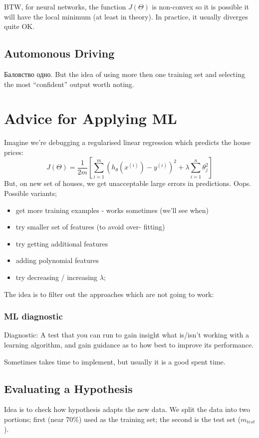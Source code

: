 \documentclass{scrartcl}
\begin{document}
BTW, for neural networks, the function $J(\Theta)$ is non-convex so it
is possible it will have the local minimum (at least in theory). In
practice, it usually diverges quite OK.

\subsection{Automonous Driving}
\label{sec:9-8}
Баловство одно. But the idea of using more then one training set and
selecting the most ``confident'' output worth noting.


\section{Advice for Applying ML}
\label{sec:10}
Imagine we're debugging a regularised linear regression which predicts
the house prices:
\[J(\Theta) = \frac{1}{2m} \left[ \sum\limits_{i=1}^{m}
  (h_\theta(x^{(i)}) - y^{(i)})^2 + \lambda \sum
  \limits_{i=1}^{n}\theta_j^2 \right] \] But, on new set of houses, we
get unacceptable large errors in predictions. Oops.
Possible variants;
\begin{itemize}
\item get more training examples - works sometimes (we'll see when)
\item try smaller set of features (to avoid over- fitting)
\item try getting additional features
\item adding polynomial features
\item try decreasing / increasing $\lambda$;
\end{itemize}
The idea is to filter out the approaches which are not going to work:

\subsubsection{ML diagnostic}
Diagnostic: A test that you can run to gain insight what is/isn't
working with a learning algorithm, and gain guidance as to how best to
improve its performance.

Sometimes takes time to implement, but usually it is a good spent time.

\subsection{Evaluating a Hypothesis}
\label{sec:10-2}
Idea is to check how  hypothesis adapts the new data. We split the
data into two portions; first (near 70\%) used as the training set;
the second is the test set ($m_{test}$). 
\end{document}
